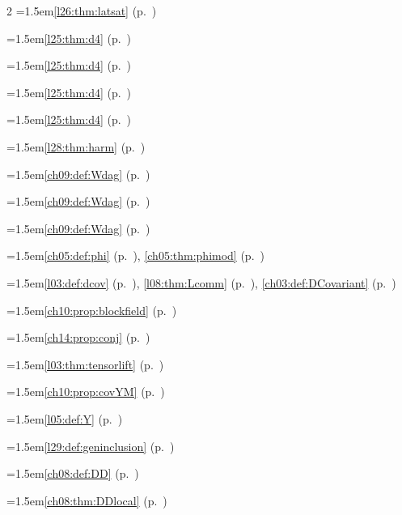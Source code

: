 \begin{multicols}{2}
\hangindent=1.5em\quad \ref{l26:thm:latsat} (p.~\pageref{l26:thm:latsat})\par
\hangindent=1.5em\quad \ref{l25:thm:d4} (p.~\pageref{l25:thm:d4})\par
\hangindent=1.5em\quad \ref{l25:thm:d4} (p.~\pageref{l25:thm:d4})\par
\hangindent=1.5em\quad \ref{l25:thm:d4} (p.~\pageref{l25:thm:d4})\par
\hangindent=1.5em\quad \ref{l25:thm:d4} (p.~\pageref{l25:thm:d4})\par
\hangindent=1.5em\quad \ref{l28:thm:harm} (p.~\pageref{l28:thm:harm})\par
\hangindent=1.5em\quad \ref{ch09:def:Wdag} (p.~\pageref{ch09:def:Wdag})\par
\hangindent=1.5em\quad \ref{ch09:def:Wdag} (p.~\pageref{ch09:def:Wdag})\par
\hangindent=1.5em\quad \ref{ch09:def:Wdag} (p.~\pageref{ch09:def:Wdag})\par
\hangindent=1.5em\quad \ref{ch05:def:phi} (p.~\pageref{ch05:def:phi}), \ref{ch05:thm:phimod} (p.~\pageref{ch05:thm:phimod})\par
\hangindent=1.5em\quad \ref{l03:def:dcov} (p.~\pageref{l03:def:dcov}), \ref{l08:thm:Lcomm} (p.~\pageref{l08:thm:Lcomm}), \ref{ch03:def:DCovariant} (p.~\pageref{ch03:def:DCovariant})\par
\hangindent=1.5em\quad \ref{ch10:prop:blockfield} (p.~\pageref{ch10:prop:blockfield})\par
\hangindent=1.5em\quad \ref{ch14:prop:conj} (p.~\pageref{ch14:prop:conj})\par
\hangindent=1.5em\quad \ref{l03:thm:tensorlift} (p.~\pageref{l03:thm:tensorlift})\par
\hangindent=1.5em\quad \ref{ch10:prop:covYM} (p.~\pageref{ch10:prop:covYM})\par
\hangindent=1.5em\quad \ref{l05:def:Y} (p.~\pageref{l05:def:Y})\par
\hangindent=1.5em\quad \ref{l29:def:geninclusion} (p.~\pageref{l29:def:geninclusion})\par
\hangindent=1.5em\quad \ref{ch08:def:DD} (p.~\pageref{ch08:def:DD})\par
\hangindent=1.5em\quad \ref{ch08:thm:DDlocal} (p.~\pageref{ch08:thm:DDlocal})\par

\end{multicols}
